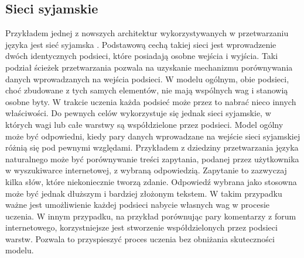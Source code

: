 \subsection{Sieci syjamskie} \label{arch:malstm}
Przykładem jednej z nowszych architektur wykorzystywanych w przetwarzaniu języka jest sieć syjamska \cite{malstm:paper}. Podstawową cechą takiej sieci jest wprowadzenie dwóch identycznych podsieci, które posiadają osobne wejścia i wyjścia. Taki podział ścieżek przetwarzania pozwala na uzyskanie mechanizmu porównywania danych wprowadzanych na wejścia podsieci. W modelu ogólnym, obie podsieci, choć zbudowane z tych samych elementów, nie mają wspólnych wag i stanowią osobne byty. W trakcie uczenia każda podsieć może przez to nabrać nieco innych właściwości. Do pewnych celów wykorzystuje się jednak sieci syjamskie, w których wagi lub całe warstwy są współdzielone przez podsieci. Model ogólny może być odpowiedni, kiedy pary danych wprowadzane na wejście sieci syjamskiej różnią się pod pewnymi względami. Przykładem z dziedziny przetwarzania języka naturalnego może być porównywanie treści zapytania, podanej przez użytkownika w wyszukiwarce internetowej, z wybraną odpowiedzią. Zapytanie to zazwyczaj kilka słów, które niekoniecznie tworzą zdanie. Odpowiedź wybrana jako stosowna może być jednak dłuższym i bardziej złożonym tekstem. W takim przypadku ważne jest umożliwienie każdej podsieci nabycie własnych wag w procesie uczenia. W innym przypadku, na przykład porównując pary komentarzy z forum internetowego, korzystniejsze jest stworzenie współdzielonych przez podsieci warstw. Pozwala to przyspieszyć proces uczenia bez obniżania skuteczności modelu.